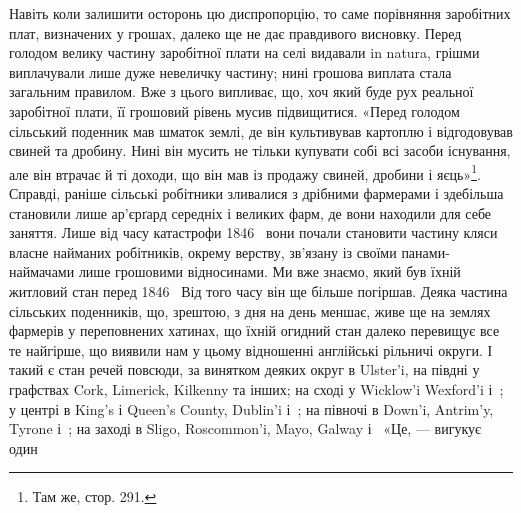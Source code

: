 Навіть коли залишити осторонь цю диспропорцію, то саме
порівняння заробітних плат, визначених у грошах, далеко ще
не дає правдивого висновку. Перед голодом велику частину заробітної
плати на селі видавали in natura, грішми виплачували
лише дуже невеличку частину; нині грошова виплата стала загальним
правилом. Вже з цього випливає, що, хоч який буде
рух реальної заробітної плати, її грошовий рівень мусив підвищитися.
«Перед голодом сільський поденник мав шматок
землі, де він культивував картоплю і відгодовував свиней та
дробину. Нині він мусить не тільки купувати собі всі засоби
існування, але він втрачає й ті доходи, що він мав із продажу
свиней, дробини і яєць»\footnote{
Там же, стор. 291.
}. Справді, раніше сільські робітники
зливалися з дрібними фармерами і здебільша становили
лише ар’єрґард середніх і великих фарм, де вони находили для
себе заняття. Лише від часу катастрофи 1846~ вони почали становити
частину кляси власне найманих робітників, окрему верству,
зв’язану із своїми панами-наймачами лише грошовими відносинами.
Ми вже знаємо, який був їхній житловий стан перед 1846~
Від того часу він ще більше погіршав. Деяка частина сільських
поденників, що, зрештою, з дня на день меншає, живе ще на
землях фармерів у переповнених хатинах, що їхній огидний стан
далеко перевищує все те найгірше, що виявили нам у цьому відношенні
англійські рільничі округи. І такий є стан речей повсюди,
за винятком деяких округ в Ulster’i, на півдні у графствах
Cork, Limerick, Kilkenny та інших; на сході у Wicklow’i
Wexford’i і~; у центрі в King’s і Queen’s County, Dublin’i
і~; на півночі в Down’i, Antrim’y, Tyrone і~; на заході
в Sligo, Roscommon’i, Mayo, Galway і~ «Це, — вигукує один
\parbreak{}  %
